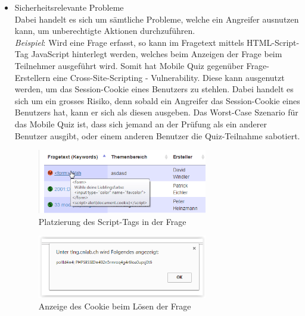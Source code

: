 	
	\begin{itemize}
		\item Sicherheitsrelevante Probleme \\
		Dabei handelt es sich um sämtliche Probleme, welche ein Angreifer ausnutzen kann, um unberechtigte Aktionen durchzuführen. \\
		\textit{Beispiel}: Wird eine Frage erfasst, so kann im Fragetext mittels HTML-Script-Tag JavaScript hinterlegt werden, welches beim Anzeigen der Frage beim Teilnehmer ausgeführt wird. Somit hat Mobile Quiz gegenüber Frage-Erstellern eine \gls{Cross-Site-Scripting} - \gls{Vulnerability}. Diese kann ausgenutzt werden, um das Session-Cookie eines Benutzers zu stehlen. Dabei handelt es sich um ein grosses Risiko, denn sobald ein Angreifer das Session-Cookie eines Benutzers hat, kann er sich als diesen ausgeben. Das Worst-Case Szenario für das Mobile Quiz ist, dass sich jemand an der Prüfung als ein anderer Benutzer ausgibt, oder einem anderen Benutzer die Quiz-Teilnahme sabotiert.
		
		\begin{figure}[H]
			\centering
			\includegraphics[width=0.7\textwidth
			]{Images/XSS_Frage.PNG}
			\caption{Platzierung des Script-Tags in der Frage}
		\end{figure}
		
		\begin{figure}[H]
			\centering
			\includegraphics[width=0.7\textwidth
			]{Images/XSS_Cookie.PNG}
			\caption{Anzeige des Cookie beim Lösen der Frage}
		\end{figure}
		

\end{itemize}
